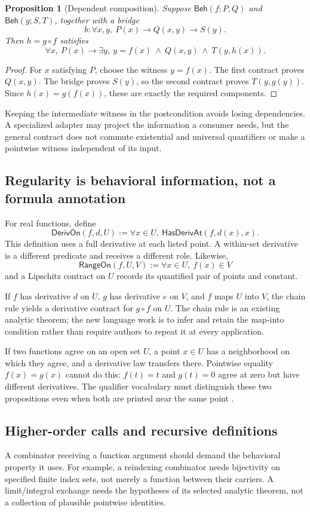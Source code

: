 \documentclass[11pt,a4paper]{article}
\newtheorem{proposition}[theorem]{Proposition}
\theoremstyle{definition}
\theoremstyle{remark}
\newcommand{\Beh}{\mathsf{Beh}}
\newcommand{\HasDeriv}{\mathsf{HasDerivAt}}
\begin{document}
\begin{proposition}[Dependent composition]
\label{prop:composition}
Suppose $\Beh(f;P,Q)$ and $\Beh(g;S,T)$, together with a bridge
\[
 b:\forall x,y,\ P(x)\to Q(x,y)\to S(y).
\]
Then $h=g\circ f$ satisfies
\[
 \forall x,\ P(x)\to
 \exists y,\ y=f(x)\ \wedge\ Q(x,y)\ \wedge\ T(y,h(x)).
\]
\end{proposition}
\begin{proof}
For $x$ satisfying $P$, choose the witness $y=f(x)$. The first contract proves $Q(x,y)$. The bridge proves $S(y)$, so the second contract proves $T(y,g(y))$. Since $h(x)=g(f(x))$, these are exactly the required components.
\end{proof}
Keeping the intermediate witness in the postcondition avoids losing dependencies. A specialized adapter may project the information a consumer needs, but the general contract does not commute existential and universal quantifiers or make a pointwise witness independent of its input.

\subsection{Regularity is behavioral information, not a formula annotation}
For real functions, define
\[
 \mathsf{DerivOn}(f,d,U)
 :=\forall x\in U,\ \HasDeriv(f,d(x),x).
\]
This definition uses a full derivative at each listed point. A within-set derivative is a different predicate and receives a different role. Likewise,
\[
 \mathsf{RangeOn}(f,U,V):=\forall x\in U,\ f(x)\in V
\]
and a Lipschitz contract on $U$ records its quantified pair of points and constant.

If $f$ has derivative $d$ on $U$, $g$ has derivative $e$ on $V$, and $f$ maps $U$ into $V$, the chain rule yields a derivative contract for $g\circ f$ on $U$. The chain rule is an existing analytic theorem; the new language work is to infer and retain the map-into condition rather than require authors to repeat it at every application.

If two functions agree on an open set $U$, a point $x\in U$ has a neighborhood on which they agree, and a derivative law transfers there. Pointwise equality $f(x)=g(x)$ cannot do this: $f(t)=t$ and $g(t)=0$ agree at zero but have different derivatives. The qualifier vocabulary must distinguish these two propositions even when both are printed near the same point \cite{synA,synB}.

\subsection{Higher-order calls and recursive definitions}
A combinator receiving a function argument should demand the behavioral property it uses. For example, a reindexing combinator needs bijectivity on specified finite index sets, not merely a function between their carriers. A limit/integral exchange needs the hypotheses of its selected analytic theorem, not a collection of plausible pointwise identities.
\end{document}
